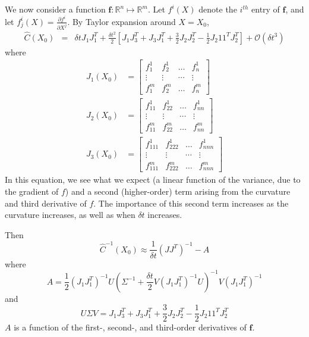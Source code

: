 \documentclass[1p]{elsarticle}
\begin{document}
We now consider a function $\mathbf{f}: \mathbb{R}^n \mapsto \mathbb{R}^m$.
%
Let $f^i(X)$ denote the $i^{th}$ entry of $\mathbf{f}$, and let $f^i_j(X) = \frac{\partial f^i}{\partial X^j}$.
%
By Taylor expansion around $X=X_0$,
%
\begin{eqnarray}
\hat{C}(X_0) &=& \delta t J_1 J_1^T 
+ \frac{\delta t^2}{2} \left[ J_1 J_3^T + J_3 J_1^T  
+ \frac{3}{2} J_2 J_2^T 
-\frac{1 }{2} J_2 1 1^T J_2^T \right]
+ \mathcal{O} (\delta t^3) %
\end{eqnarray}
where
\begin{equation}
\begin{aligned}
J_1(X_0) &= \begin{bmatrix}
f_1^1 & f_2^1 & \dots & f_n^1 \\
\vdots & \vdots & \cdots & \vdots \\
f_1^m & f_2^m & \dots & f_n^m
\end{bmatrix}\\
%
J_2(X_0) &= \begin{bmatrix}
f_{11}^1 & f_{22}^1 & \dots & f_{nn}^1 \\
\vdots & \vdots & \cdots & \vdots \\
f_{11}^m & f_{22}^m & \dots & f_{nn}^m
\end{bmatrix}\\
%
J_3(X_0) &= \begin{bmatrix}
f_{111}^1 & f_{222}^1 & \dots & f_{nnn}^1 \\
\vdots & \vdots & \cdots & \vdots \\
f_{111}^m & f_{222}^m & \dots & f_{nnn}^m
\end{bmatrix}
\end{aligned}
\end{equation}
%
In this equation, we see what we expect (a linear function of the variance, due to the gradient of $f$) and a second (higher-order) term arising from the curvature and third derivative of $f$.
%
The importance of this second term increases as the curvature increases, as well as when $\delta t$ increases. 



Then
\begin{equation}
\hat{C}^{-1}(X_0) \approx \frac{1}{\delta t} \left( J J^T \right)^{-1} - A
\end{equation}
%
where 
\begin{equation}
A = \frac{1}{2} (J_1 J_1^T)^{-1} U \left(\Sigma^{-1} + \frac{\delta t}{2} V \left( J_1 J_1^T \right)^{-1} U \right)^{-1} V \left( J_1 J_1^T \right)^{-1}
\end{equation}
and
\begin{equation}
U \Sigma V = J_1 J_3^T + J_3 J_1^T + \frac{3}{2} J_2 J_2^T -\frac{1 }{2} J_2 1 1^T J_2^T 
\end{equation}
$A$ is a function of the first-, second-, and third-order derivatives of $\mathbf{f}$.
\end{document}
